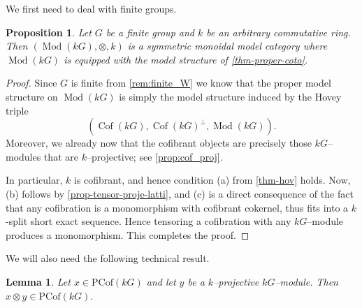 \documentclass{amsart}
\DeclareMathOperator{\Mod}{Mod}
\DeclareMathOperator{\Cof}{Cof}
\numberwithin{equation}{section}%
\newtheorem{proposition}[equation]{Proposition}
\newtheorem{lemma}[equation]{Lemma}
\theoremstyle{remark}
\begin{document}
{We first need to deal with finite groups. 

\begin{proposition}\label{prop-monoidal-finite}
    Let $G$ be a finite group and $k$ be an arbitrary commutative ring. Then $(\Mod(kG),\otimes, k)$ is a symmetric monoidal model category where $\Mod(kG)$ is equipped with the model structure of  \cref{thm-proper-coto}.
\end{proposition}

\begin{proof}
Since $G$ is finite from \cref{rem:finite_W} we know that the proper model structure on $\Mod(kG)$ is simply the model structure induced by the Hovey triple 
    \[
    (\Cof(kG),\Cof(kG)^\perp,\Mod(kG)).
    \]
    Moreover, we already now that the cofibrant objects are precisely those $kG$--modules that are $k$--projective; see \cref{prop:cof_proj}. 

    In particular, $k$ is cofibrant, and hence condition (a) from \cref{thm-hov} holds. Now, (b) follows by \cref{prop-tensor-proje-latti}, and (c) is a direct consequence of the fact that any cofibration is a monomorphism with cofibrant cokernel, thus fits into a $k$-split short exact sequence. Hence tensoring a cofibration with any $kG$--module produces a monomorphism. This completes the proof. 
\end{proof}

We will also need the following technical result.

 \begin{lemma}
\label{lem:tensors}
Let $x\in\mathrm{PCof}(kG)$ and let $y$ be a $k$--projective $kG$--module. Then $x\otimes y\in\mathrm{PCof}(kG).$ 
\end{lemma}


}
\end{document}
